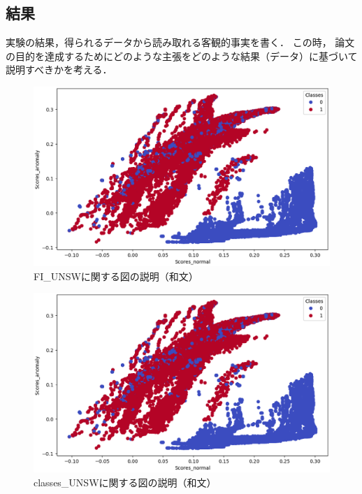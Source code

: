 \documentclass{css}
\begin{document}
\subsection{結果}
実験の結果，得られるデータから読み取れる客観的事実を書く．
この時， 論文の目的を達成するためにどのような主張をどのような結果（データ）に基づいて説明すべきかを考える．

\begin{figure}[tb]
    \centering
    \includegraphics[width=\linewidth]{pictures/eps/classes_UNSW.eps}
    \caption{FI\_UNSWに関する図の説明（和文）}
    \label{fig:FI_UNSW}
\end{figure}

\begin{figure}[tb]
    \centering
    \includegraphics[width=\linewidth]{pictures/eps/classes_UNSW.eps}
    \caption{classes\_UNSWに関する図の説明（和文）}
    \label{fig:classes_UNSW}
\end{figure}
\end{document}
